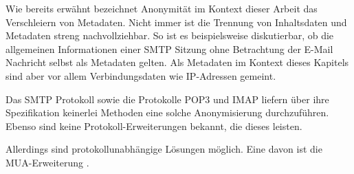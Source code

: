 Wie bereits erwähnt bezeichnet Anonymität im Kontext dieser Arbeit das Verschleiern von Metadaten. Nicht immer ist die Trennung von Inhaltsdaten und Metadaten streng nachvollziehbar. So ist es beispielsweise diskutierbar, ob die allgemeinen Informationen einer SMTP Sitzung ohne Betrachtung der E-Mail Nachricht selbst als Metadaten gelten. Als Metadaten im Kontext dieses Kapitels sind aber vor allem Verbindungsdaten wie IP-Adressen gemeint.

Das SMTP Protokoll sowie die Protokolle POP3 und IMAP liefern über ihre Spezifikation keinerlei Methoden eine solche Anonymisierung durchzuführen. Ebenso sind keine Protokoll-Erweiterungen bekannt, die dieses leisten.

Allerdings sind protokollunabhängige Lösungen möglich. Eine davon ist die MUA-Erweiterung .

